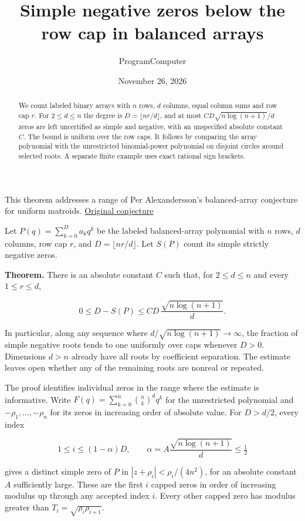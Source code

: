 \documentclass[11pt]{article}
\title{Simple negative zeros below the row cap in balanced arrays}
\author{ProgramComputer}
\date{November 26, 2026}
\begin{document}
\maketitle
\begin{abstract}
We count labeled binary arrays with $n$ rows, $d$ columns, equal
column sums and row cap $r$. For $2\le d\le n$ the degree is
$D=\lfloor nr/d\rfloor$, and at most
$CD\sqrt{n\log(n+1)}/d$ zeros are left uncertified as simple and
negative, with an unspecified absolute constant $C$. The bound
is uniform over the row caps. It follows by comparing the array
polynomial with the unrestricted binomial-power polynomial on
disjoint circles around selected roots. A separate finite example
uses exact rational sign brackets.
\end{abstract}

This theorem addresses a range of Per Alexandersson's balanced-array conjecture for uniform matroids. \href{https://www.symmetricfunctions.com/realRootedOpenProblems.htm\#conjBalancedArrays}{Original conjecture}

Let $P(q)=\sum_{k=0}^D a_kq^k$ be the labeled balanced-array polynomial with $n$ rows, $d$ columns, row cap $r$, and $D=\lfloor nr/d\rfloor$. Let $S(P)$ count its simple strictly negative zeros.

\textbf{Theorem.} There is an absolute constant $C$ such that, for $2\le d\le n$ and every $1\le r\le d$,

\[
0\le D-S(P)\le C D\,\frac{\sqrt{n\log(n+1)}}{d}.
\]

In particular, along any sequence where $d/\sqrt{n\log(n+1)}\to\infty$, the fraction of simple negative roots tends to one uniformly over caps whenever $D>0$. Dimensions $d>n$ already have all roots by coefficient separation. The estimate leaves open whether any of the remaining roots are nonreal or repeated.

The proof identifies individual zeros in the range where the estimate is informative. Write $F(q)=\sum_{k=0}^n\binom nk^d q^k$ for the unrestricted polynomial and $-\rho_1,\ldots,-\rho_n$ for its zeros in increasing order of absolute value. For $D>d/2$, every index

\[
1\le i\le (1-\alpha)D,\qquad
\alpha=A\frac{\sqrt{n\log(n+1)}}{d}\le\tfrac12
\]

gives a distinct simple zero of $P$ in $|z+\rho_i|<\rho_i/(4n^2)$, for an absolute constant $A$ sufficiently large. These are the first $i$ capped zeros in order of increasing modulus up through any accepted index $i$. Every other capped zero has modulus greater than $T_i=\sqrt{\rho_i\rho_{i+1}}$.
\end{document}
